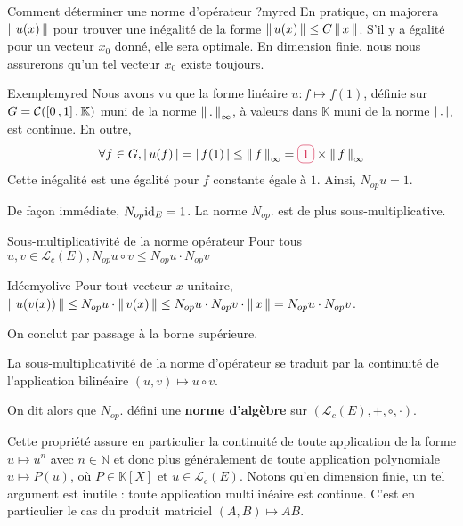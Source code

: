     \begin{omed}{Comment déterminer une norme d’opérateur ?}{myred}
        En pratique, on majorera $\left\lVert \,u(x) \, \right\rVert$ pour trouver une inégalité de la forme $\left\lVert \,u(x) \, \right\rVert \leq C \left\lVert \,x \, \right\rVert$. S’il y a égalité pour un vecteur $x_0$ donné, elle sera optimale. En dimension finie, nous nous assurerons qu’un tel vecteur $x_0$ existe toujours.
    \end{omed}

    \begin{omed}{Exemple}{myred}
        Nous avons vu que la forme linéaire $u : f \mapsto f(1)$, définie sur $G = \mathcal{C}(\left[ 0 \, , 1 \right],\mathbb{K})$ muni de la norme $\left\lVert \,. \, \right\rVert_{\infty}$, à valeurs dans $\mathbb{K}$ muni de la norme $\left\lvert \,. \, \right\rvert$, est continue. En outre,
        \[ \forall f \in G, \abs{u(f)} = \abs{f(1)} \leq \norm{f}_{\infty} = \lilbox{myred}{$1$} \times \norm{f}_{\infty} \]
        Cette inégalité est une égalité pour $f$ constante égale à $1$. Ainsi, $N_{op}{u} = 1$.
    \end{omed}

    De façon immédiate, $N_{op}{\operatorname{id}_E} = 1$. La norme $N_{op}{.}$ est de plus sous-multiplicative.

    \begin{prop}{Sous-multiplicativité de la norme opérateur}{}
        Pour tous $u,v \in \mathcal{L}_c(E), N_{op}{u \circ v} \leq N_{op}{u} \cdot N_{op}{v}$
    \end{prop}

    \begin{demo}{Idée}{myolive}
        Pour tout vecteur $x$ unitaire, $\left\lVert \,u(v(x)) \, \right\rVert \leq N_{op}{u} \cdot \left\lVert \,v(x) \, \right\rVert \leq N_{op}{u} \cdot N_{op}{v} \cdot \left\lVert \,x \, \right\rVert = N_{op}{u} \cdot N_{op}{v}$.

        On conclut par passage à la borne supérieure.
    \end{demo}

    La sous-multiplicativité de la norme d’opérateur se traduit par la continuité de l’application bilinéaire $(u,v) \longmapsto u \circ v$. 

    On dit alors que $N_{op}{.}$ défini une \textbf{norme d’algèbre} sur $\left(\mathcal{L}_c(E), +, \circ, \cdot\right)$.

    Cette propriété assure en particulier la continuité de toute application de la forme $u \mapsto u^n$ avec $n \in \mathbb{N}$ et donc plus généralement de toute application polynomiale $u \mapsto P(u)$, où $P \in \mathbb{K}[X]$ et $u \in \mathcal{L}_c(E)$. Notons qu’en dimension finie, un tel argument est inutile : toute application multilinéaire est continue. C’est en particulier le cas du produit matriciel $(A,B) \mapsto AB$. 

